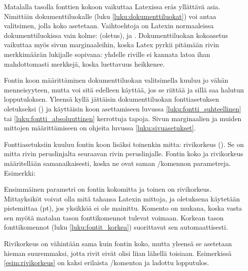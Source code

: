 Matalalla tasolla fonttien kokoon vaikuttaa Latexissa eräs yllättävä
asia. Nimittäin dokumenttiluokalle (luku \ref{luku:dokumenttiluokat})
voi antaa valitsimen, jolla koko asetetaan. Vaihtoehtoja on Latexin
normaaleissa dokumenttiluokissa vain kolme: \koodi{10pt} (oletus),
\koodi{11pt} ja \koodi{12pt}. Dokumenttiluokan koko\-asetus vaikuttaa
myös sivun marginaaleihin, koska Latex pyrkii pitämään rivin
merkkimäärän lukijalle sopivana: yhdelle riville ei kannata latoa ihan
mahdottomasti merkkejä, koska luettavuus heikkenee.

Fontin koon määrittäminen dokumenttiluokan valitsimella kuuluu jo vähän
menneisyyteen, mutta voi sitä edelleen käyttää, jos se riittää ja sillä
saa halutun lopputuloksen. Yleensä kyllä jättäisin dokumenttiluokan
fontti\-asetuksen oletukseksi (\koodi{10pt}) ja käyttäisin koon
asettamiseen luvussa \ref{luku:fontti_suhteellinen} tai
\ref{luku:fontti_absoluuttinen} kerrottuja tapoja. Sivun marginaalien ja
muiden mittojen määrittämiseen on ohjeita luvussa
\ref{luku:sivuasetukset}.

Fontti\-asetuksiin kuuluu fontin koon lisäksi toinenkin mitta:
rivikorkeus (). Se on mitta rivin
peruslinjalta seuraavan rivin peruslinjalle. Fontin koko ja rivikorkeus
määritellään saman\-aikaisesti, koska ne ovat saman \-/komennon parametreja. Esimerkki:

\begin{koodilohkosis}
  \fontsize{10pt}{12pt} \selectfont
\end{koodilohkosis}

Ensimmäinen parametri on fontin kokomitta ja toinen on rivikorkeus.
Mitta\-yksiköt voivat olla mitä tahansa Latexin mittoja, ja oletuksena
käytetään pistemittaa (pt), jos yksikköä ei ole mainittu. Komento
 on mukana, koska vasta sen myötä matalan tason
fonttikomennot tulevat voimaan. Korkean tason fonttikomennot (luku
\ref{luku:fontit_korkea}) suorittavat sen automaattisesti.

Rivikorkeus on vähintään sama kuin fontin koko, mutta yleensä se
asetetaan hieman suuremmaksi, jotta rivit eivät olisi liian lähellä
toisiaan. Esimerkissä \ref{esim:rivikorkeus} on kaksi erilaista
\-/komentoa ja ladottu lopputulos.

